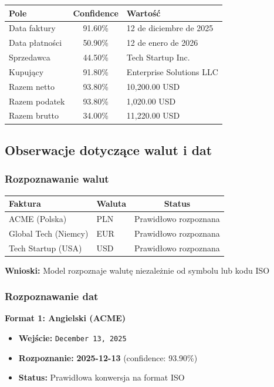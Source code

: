 \begin{center}
	\begin{tabular}{|l|c|l|}
		\hline
		\textbf{Pole} & \textbf{Confidence} & \textbf{Wartość} \\
		\hline
		Data faktury & 91.60\% & 12 de diciembre de 2025 \\
		Data płatności & 50.90\% & 12 de enero de 2026 \\
		Sprzedawca & 44.50\% & Tech Startup Inc. \\
		Kupujący & 91.80\% & Enterprise Solutions LLC \\
		Razem netto & 93.80\% & 10,200.00 USD \\
		Razem podatek & 93.80\% & 1,020.00 USD \\
		Razem brutto & 34.00\% & 11,220.00 USD \\
		\hline
	\end{tabular}
\end{center}

\subsection{Obserwacje dotyczące walut i dat}

\subsubsection{Rozpoznawanie walut}

\begin{center}
	\begin{tabular}{|l|l|c|}
		\hline
		\textbf{Faktura} & \textbf{Waluta} & \textbf{Status} \\
		\hline
		ACME (Polska) & PLN & Prawidłowo rozpoznana \\
		Global Tech (Niemcy) & EUR & Prawidłowo rozpoznana \\
		Tech Startup (USA) & USD & Prawidłowo rozpoznana \\
		\hline
	\end{tabular}
\end{center}

\textbf{Wnioski:}
Model rozpoznaje walutę niezależnie od symbolu lub kodu ISO


\subsubsection{Rozpoznawanie dat}

\textbf{Format 1: Angielski (ACME)}
\begin{itemize}
	\item \textbf{Wejście:} \texttt{December 13, 2025}
	\item \textbf{Rozpoznanie:} \textbf{2025-12-13} (confidence: 93.90\%)
	\item \textbf{Status:} Prawidłowa konwersja na format ISO
\end{itemize}

